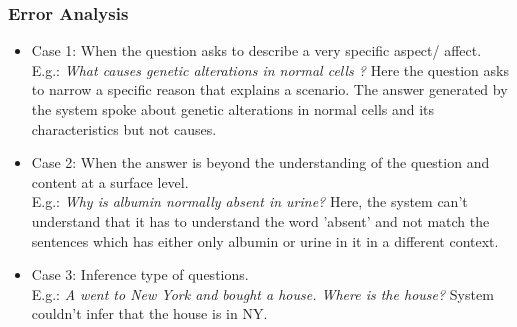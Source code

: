 \subsubsection{Error Analysis}
\begin{itemize}
    \item Case 1: When the question asks to describe a very specific aspect/ affect. \\
    E.g.: \textit{What causes genetic alterations in normal cells ?}
    Here the question asks to narrow a specific reason that explains a scenario. The answer generated by the system spoke about genetic alterations in normal cells and its characteristics but not causes.
    \item Case 2: When the answer is beyond the understanding of the question and content at a surface level. \\
    E.g.: \textit{Why is albumin normally absent in urine?} Here, the system can't understand that it has to understand the word 'absent' and not match the sentences which has either only albumin or urine in it in a different context.  
    \item Case 3: Inference type of questions. \\
    E.g.: \textit{A went to New York and bought a house. Where is the house?}
    System couldn't infer that the house is in NY.
\end{itemize}